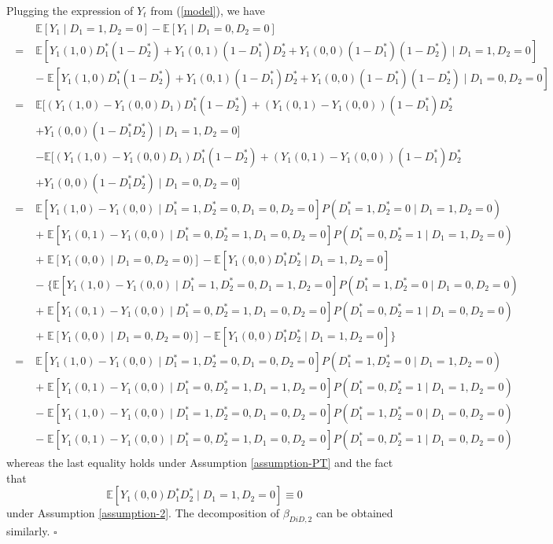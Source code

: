 \documentclass[a4paper,12pt]{article}
\begin{document}
Plugging the expression of $Y_t$ from (\ref{model}), we have
\begin{align}
\begin{split}
    &\mathbb{E}[Y_1 \mid D_1=1,D_2=0] - \mathbb{E}[Y_1 \mid D_1=0,D_2=0]\\
    = \;&\mathbb{E}[Y_1(1,0)D_1^\ast(1-D_2^\ast) + Y_1(0,1)(1-D_1^\ast)D_2^\ast + Y_1(0,0)(1-D_1^\ast)(1-D_2^\ast) \mid D_1=1,D_2=0]\\
    &- \;\mathbb{E}[Y_1(1,0)D_1^\ast(1-D_2^\ast) + Y_1(0,1)(1-D_1^\ast)D_2^\ast + Y_1(0,0)(1-D_1^\ast)(1-D_2^\ast) \mid D_1=0,D_2=0]\\
    = \;&\mathbb{E}[(Y_1(1,0)-Y_1(0,0)D_1)D_1^\ast(1-D_2^\ast) + (Y_1(0,1)-Y_1(0,0))(1-D_1^\ast)D_2^\ast \\ &+Y_1(0,0)(1-D_1^\ast D_2^\ast) \mid D_1=1,D_2=0]\\
    &-\mathbb{E}[(Y_1(1,0)-Y_1(0,0)D_1)D_1^\ast(1-D_2^\ast) + (Y_1(0,1)-Y_1(0,0))(1-D_1^\ast)D_2^\ast \\ &+ Y_1(0,0)(1-D_1^\ast D_2^\ast) \mid D_1=0,D_2=0]\\
    = \;&\mathbb{E}[Y_1(1,0)-Y_1(0,0) \mid D_1^\ast=1, D_2^\ast=0,D_1=0,D_2=0]P(D_1^\ast=1,D_2^\ast=0 \mid D_1=1, D_2=0)\\
    &+ \;\mathbb{E}[Y_1(0,1)-Y_1(0,0) \mid D_1^\ast=0, D_2^\ast=1,D_1=0,D_2=0]P(D_1^\ast=0,D_2^\ast=1 \mid D_1=1, D_2=0)\\
    &+ \;\mathbb{E}[Y_1(0,0) \mid D_1=0,D_2=0)] - \mathbb{E}[Y_1(0,0)D_1^\ast D_2^\ast \mid D_1=1,D_2=0]\\\
    &- \;\{\mathbb{E}[Y_1(1,0)-Y_1(0,0) \mid D_1^\ast=1, D_2^\ast=0,D_1=1,D_2=0]P(D_1^\ast=1,D_2^\ast=0 \mid D_1=0, D_2=0)\\
    &+ \;\mathbb{E}[Y_1(0,1)-Y_1(0,0) \mid D_1^\ast=0, D_2^\ast=1,D_1=0,D_2=0]P(D_1^\ast=0,D_2^\ast=1 \mid D_1=0, D_2=0)\\
    & + \;\mathbb{E}[Y_1(0,0) \mid D_1=0,D_2=0)] - \mathbb{E}[Y_1(0,0)D_1^\ast D_2^\ast \mid D_1=1,D_2=0]\}\\
    = \;&\mathbb{E}[Y_1(1,0)-Y_1(0,0) \mid D_1^\ast=1, D_2^\ast=0,D_1=0,D_2=0]P(D_1^\ast=1,D_2^\ast=0 \mid D_1=1, D_2=0)\\
    &+ \;\mathbb{E}[Y_1(0,1)-Y_1(0,0) \mid D_1^\ast=0, D_2^\ast=1,D_1=1,D_2=0]P(D_1^\ast=0,D_2^\ast=1 \mid D_1=1, D_2=0)\\
    &- \;\mathbb{E}[Y_1(1,0)-Y_1(0,0) \mid D_1^\ast=1, D_2^\ast=0,D_1=0,D_2=0]P(D_1^\ast=1,D_2^\ast=0 \mid D_1=0, D_2=0)\\
    &- \;\mathbb{E}[Y_1(0,1)-Y_1(0,0) \mid D_1^\ast=0, D_2^\ast=1,D_1=0,D_2=0]P(D_1^\ast=0,D_2^\ast=1 \mid D_1=0, D_2=0)
\end{split}
\end{align}
whereas the last equality holds under Assumption \ref{assumption-PT} and the fact that
\begin{equation*}
    \mathbb{E}[Y_1(0,0)D_1^\ast D_2^\ast \mid D_1=1,D_2=0] \equiv 0
\end{equation*}
under Assumption \ref{assumption-2}. The decomposition of $\beta_{DiD,2}$ can be obtained similarly. $\square$
\end{document}
